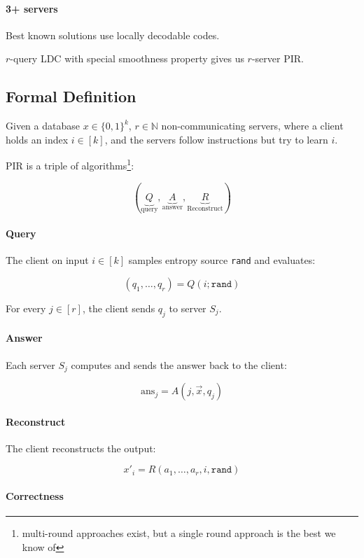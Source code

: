 \documentclass{idc_msc}
\begin{document}
\paragraph{3+ servers}

Best known solutions use locally decodable codes.

\(r\)-query LDC with special smoothness property gives us \(r\)-server PIR.

\subsection{Formal Definition}

Given a database \(x \in \{0,1\}^k\), \(r \in \mathbb{N}\) non-communicating servers, where a client holds an index \(i \in [k]\), and the servers follow instructions but try to learn \(i\).

PIR is a triple of algorithms\footnote{multi-round approaches exist, but a single round approach is the best we know of}:

\[(\underbrace{Q}_{\text{query}}, \underbrace{A}_{\text{answer}}, \underbrace{R}_{\text{Reconstruct}})\]

\paragraph{Query}

The client on input \(i \in [k]\) samples entropy source \texttt{rand} and evaluates:

\[(q _1, \ldots, q_r) = Q(i; \texttt{rand})\]

For every \(j \in [r]\), the client sends \(q_j\) to server \(S_j\).

\paragraph{Answer}

Each server \(S_j\) computes and sends the answer back to the client:

\[\text{ans}_j = A(j,\vec{x},q_j)\]

\paragraph{Reconstruct}

The client reconstructs the output:

\[x'_i = R(a_1, \ldots, a_r, i, \texttt{rand})\]

\paragraph{Correctness}
\end{document}
